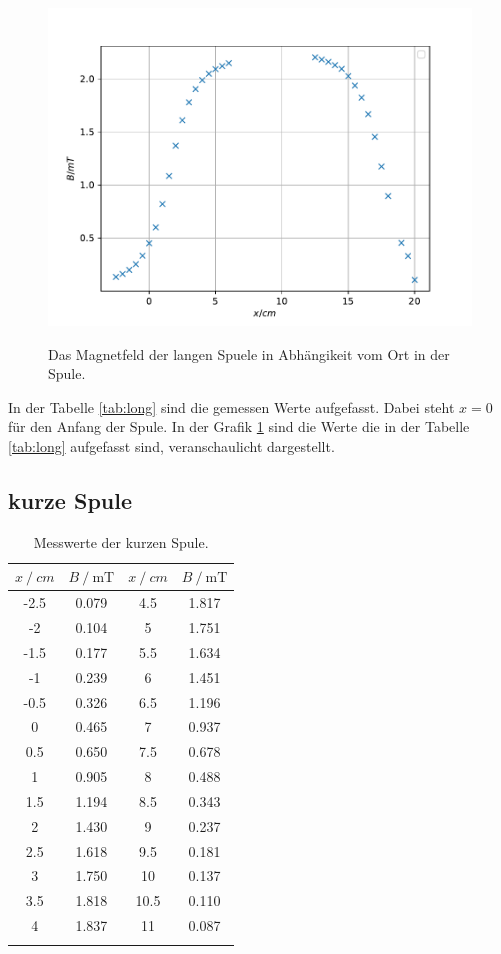 \begin{figure}
  \centering
  \caption{Das Magnetfeld der langen Spuele in Abhängikeit vom Ort in der Spule.}
  \includegraphics[width=\textwidth]{content/data/plot_long.pdf}
  \label{fig:long}
\end{figure}

In der Tabelle \ref{tab:long} sind die gemessen Werte aufgefasst.
Dabei steht $x=0$ für den Anfang der Spule.
In der Grafik \ref{fig:long} sind die Werte die in der Tabelle \ref{tab:long} aufgefasst sind, veranschaulicht dargestellt.

\FloatBarrier
\subsection{kurze Spule}

\begin{table}
\centering
\caption{Messwerte der kurzen Spule.}
\begin{tabular}{cc|cc}
\toprule
$x \:/\: \si{cm}$ & $B \:/\: \si{\milli\tesla}$ &$x \:/\: \si{cm}$ & $B \:/\: \si{\milli\tesla}$ \\
\midrule
-2.5 & 0.079 & 4.5 & 1.817  \\
-2 & 0.104 & 5 & 1.751  \\
-1.5 & 0.177 & 5.5 & 1.634  \\
-1 & 0.239 & 6 & 1.451  \\
-0.5 & 0.326 & 6.5 & 1.196  \\
0 & 0.465  & 7 & 0.937  \\
0.5 & 0.650  & 7.5 & 0.678  \\
1 & 0.905  & 8 & 0.488  \\
1.5 & 1.194  &  8.5 & 0.343  \\
2 & 1.430  & 9 & 0.237  \\
2.5 & 1.618  & 9.5 & 0.181  \\
3 & 1.750  & 10 & 0.137 \\
3.5 & 1.818  & 10.5 & 0.110 \\
4 & 1.837  & 11 & 0.087 \\
\bottomrule
\label{tab:short}
\end{tabular}
\end{table}

